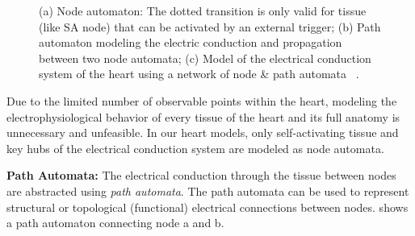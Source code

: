 \begin{figure}[!t]
\centering
\label{fig:h_automatas}
\caption{\small (a) Node automaton: The dotted transition is only valid for tissue (like SA node) that can be activated by an external trigger; (b) Path automaton modeling the electric conduction and propagation between two node automata; (c) Model of the electrical conduction system of the heart using a network of node \& path automata ~\cite{VHM_proc}.}
\end{figure} 

Due to the limited number of observable points within the heart, modeling the electrophysiological behavior of every tissue of the heart and its full anatomy is unnecessary and unfeasible. In our heart models, only self-activating tissue and key hubs of the electrical conduction system are modeled as node automata. 

\textbf{Path Automata:} The electrical conduction through the tissue between nodes are abstracted using \emph{path automata}. The path automata can be used to represent structural or topological (functional) electrical connections between nodes.  shows a path automaton connecting node a and b.

